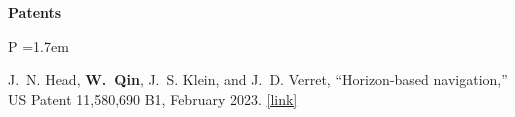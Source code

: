 \documentclass[]{res}
\begin{document}
\begin{resume}

{\bf Patents}
\begin{list}{P}
  {\leftmargin=1.7em}
\item J.~N. Head, {\bf W.~Qin}, J.~S. Klein, and J.~D. Verret, ``Horizon-based navigation,'' US Patent 11,580,690 B1, February 2023. \href{https://patents.google.com/patent/US11580690B1/en?oq=US11580690B1}{[link]}
\end{list}





\end{resume}
\end{document}
